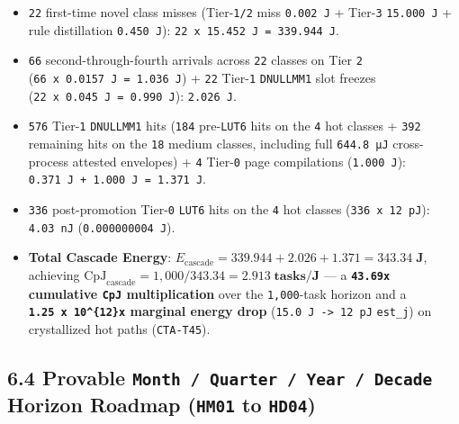 \documentclass[10pt,letterpaper]{article}
\providecommand{\tightlist}{\setlength{\itemsep}{1pt}\setlength{\parskip}{0pt}}
\begin{document}
\begin{enumerate}
\begin{itemize}
    \begin{itemize}
    \tightlist
    \item
      \texttt{22} first-time novel class misses (Tier-\texttt{1/2} miss
      \texttt{0.002\ J} + Tier-\texttt{3} \texttt{15.000\ J} + rule
      distillation \texttt{0.450\ J}):
      \texttt{22\ x\ 15.\allowbreak{}452\ J\ =\ 339.\allowbreak{}944\ J}.
    \item
      \texttt{66} second-through-fourth arrivals across \texttt{22}
      classes on Tier \texttt{2}
      (\texttt{66\ x\ 0.\allowbreak{}0157\ J\ =\ 1.\allowbreak{}036\ J}) + \texttt{22}
      Tier-\texttt{1} \texttt{DNULLMM1} slot freezes
      (\texttt{22\ x\ 0.\allowbreak{}045\ J\ =\ 0.\allowbreak{}990\ J}): \texttt{2.026\ J}.
    \item
      \texttt{576} Tier-\texttt{1} \texttt{DNULLMM1} hits (\texttt{184}
      pre-\texttt{LUT6} hits on the \texttt{4} hot classes +
      \texttt{392} remaining hits on the \texttt{18} medium classes,
      including full \texttt{644.8\ µJ} cross-process attested
      envelopes) + \texttt{4} Tier-\texttt{0} page compilations
      (\texttt{1.000\ J}): \texttt{0.\allowbreak{}371\ J\ +\ 1.\allowbreak{}000\ J\ =\ 1.\allowbreak{}371\ J}.
    \item
      \texttt{336} post-promotion Tier-\texttt{0} \texttt{LUT6} hits on
      the \texttt{4} hot classes (\texttt{336\ x\ 12\ pJ}):
      \texttt{4.03\ nJ} (\texttt{0.\allowbreak{}000000004\ J}).
    \item
      \textbf{Total Cascade Energy}:
      \(E_{\text{cascade}} = 339.944 + 2.026 + 1.371 = \mathbf{343.34\;\text{J}}\),
      achieving
      \(\mathrm{CpJ}_{\text{cascade}} = 1{,}000 / 343.34 = \mathbf{2.913\;\text{tasks/J}}\)
      --- a \textbf{\texttt{43.69x} cumulative \texttt{CpJ}
      multiplication} over the \texttt{1,000}-task horizon and a
      \textbf{\texttt{1.25\ x\ 10\^{}\{12\}x} marginal energy drop}
      (\texttt{15.0\ J\ -\textgreater{}\ 12\ pJ} \texttt{est\_j}) on
      crystallized hot paths (\texttt{CTA-T45}).
    \end{itemize}
  \end{itemize}
\end{enumerate}

\subsection{\texorpdfstring{6.4 Provable
\texttt{Month\ /\allowbreak{}\ Quarter\ /\allowbreak{}\ Year\ /\allowbreak{}\ Decade} Horizon Roadmap
(\texttt{HM01} to
\texttt{HD04})}{6.4 Provable Month / Quarter / Year / Decade Horizon Roadmap (HM01 to HD04)}}\label{provable-month-quarter-year-decade-horizon-roadmap-hm01-to-hd04}
\end{document}
